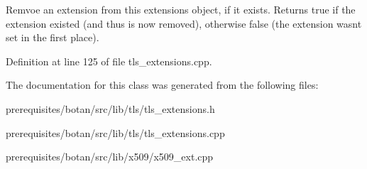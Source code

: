 Remvoe an extension from this extensions object, if it exists. Returns true if the extension existed (and thus is now removed), otherwise false (the extension wasn\textquotesingle{}t set in the first place). 

Definition at line 125 of file tls\+\_\+extensions.\+cpp.



The documentation for this class was generated from the following files\+:\begin{DoxyCompactItemize}
\item 
prerequisites/botan/src/lib/tls/tls\+\_\+extensions.\+h\item 
prerequisites/botan/src/lib/tls/tls\+\_\+extensions.\+cpp\item 
prerequisites/botan/src/lib/x509/x509\+\_\+ext.\+cpp\end{DoxyCompactItemize}
